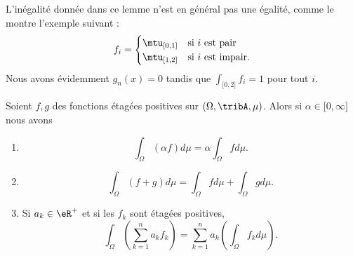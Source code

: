 L'inégalité donnée dans ce lemme n'est en général pas une égalité, comme le montre l'exemple suivant :
\begin{equation}
	f_i=\begin{cases}
		\mtu_{\mathopen[ 0 , 1 \mathclose]} & \text{si } i\text{ est pair}    \\
		\mtu_{\mathopen[ 1 , 2 \mathclose]} & \text{si } i\text{ est impair}.
	\end{cases}
\end{equation}
Nous avons évidemment \( g_n(x)=0\) tandis que \( \int_{\mathopen[ 0 , 2 \mathclose]}f_i=1\) pour tout \( i\).

\begin{theorem}        \label{ThoooCZCXooVvNcFD}
	Soient \( f,g\) des fonctions étagées positives sur \( (\Omega,\tribA,\mu)\). Alors si \( \alpha\in\mathopen[ 0 , \infty \mathclose]\) nous avons
	\begin{enumerate}
		\item
		      \begin{equation}
			      \int_{\Omega}(\alpha f)d\mu=\alpha\int_{\Omega}fd\mu.
		      \end{equation}
		\item       \label{ITEMooBLEVooDznQTY}
		      \begin{equation}
			      \int_{\Omega}(f+g)d\mu=\int_{\Omega}fd\mu+\int_{\Omega}gd\mu.
		      \end{equation}
		\item\label{ITEMooOJRAooQkoQyD}
		      Si \( a_k\in \eR^+\) et si les \( f_k\) sont étagées positives,
		      \begin{equation}
			      \int_{\Omega}\left( \sum_{k=1}^na_kf_k \right)=\sum_{k=1}^na_k\left( \int_{\Omega} f_kd\mu \right).
		      \end{equation}
	\end{enumerate}
\end{theorem}

